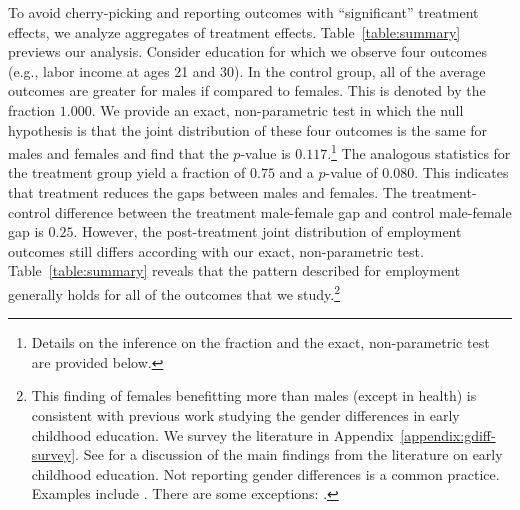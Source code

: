 To avoid cherry-picking and reporting outcomes with ``significant'' treatment effects, we analyze aggregates of treatment effects. Table~\ref{table:summary} previews our analysis. Consider education for which we observe four outcomes (e.g., labor income at ages 21 and 30). In the control group, all of the average outcomes are greater for males if compared to females. This is denoted by the fraction $1.000$. We provide an exact, non-parametric test in which the null hypothesis is that the joint distribution of these four outcomes is the same for males and females and find that the $p$-value is $0.117$.\footnote{Details on the inference on the fraction and the exact, non-parametric test are provided below.} The analogous statistics for the treatment group yield a fraction of $0.75$ and a $p$-value of $0.080$. This indicates that treatment reduces the gaps between males and females. The treatment-control difference between the treatment male-female gap and control male-female gap is $0.25$. However, the post-treatment joint distribution of employment outcomes still differs according with our exact, non-parametric test. Table~\ref{table:summary} reveals that the pattern described for employment generally holds for all of the outcomes that we study.\footnote{This finding of females benefitting more than males (except in health) is consistent with previous work studying the gender differences in early childhood education. We survey the literature in Appendix~\ref{appendix:gdiff-survey}. See \citet{Elango_Hojman_etal_2016_Early-Edu} for a discussion of the main findings from the literature on early childhood education. Not reporting gender differences is a common practice. Examples include \citet{Bernal_Keane_2011_JoLE,Cascio_Schanzenbach_2013_ImpactsExpandingAccess,Bitler_et_al_2014_Head_Start_Unpublished,Kline_Walters_2016_QJE}. There are some exceptions: \citet{Anderson_2008_JASA,Heckman_Moon_etal_2010_QE,Campbell_Conti_etal_2014_EarlyChildhoodInvestments,Garcia_Heckman_Leaf_etal_2017_Comp_CBA_Unpublished}.}

